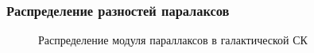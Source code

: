 \documentclass[12pt,aspectratio=43]{beamer}
\begin{document}
\begin{frame}[<alignment>]
\frametitle{Распределение разностей паралаксов}
\begin{figure}[h!]
\caption{Распределение модуля параллаксов в галактической СК}
\label{img:sf_l}
\end{figure}

\end{frame}	

\setcounter{framenumber}{\value{finalframe}}
\end{document}

